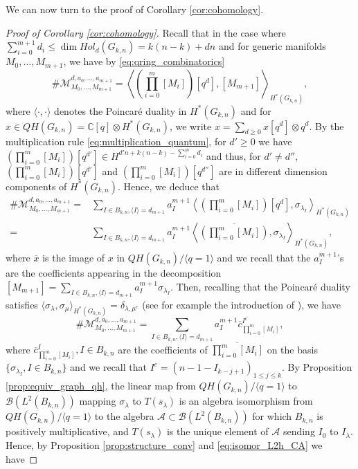 \documentclass[10pt,11pt]{amsart}%
\begin{document}
We can now turn to the proof of Corollary \ref{cor:cohomology}.
\begin{proof}[Proof of Corollary \ref{cor:cohomology}]
Recall that in the case where $\sum_{i=0}^{m+1} d_i\leq \dim Hol_d(G_{k,n})=k(n-k)+dn$ and for generic manifolds $M_0,\ldots, M_{m+1}$, we have by \eqref{eq:qring_combinatorics}
$$\#\mathcal{M}^{d,a_0,\ldots,a_{m+1}}_{M_0,\ldots,M_{m+1}}=\left\langle \left(\prod_{i=0}^{m} [M_i]\right)[q^d],[M_{m+1}]\right\rangle_{H^*(G_{k,n})},$$
where $\langle \cdot,\cdot\rangle$ denotes the Poincaré duality in $H^*(G_{k,n})$ and for $x\in QH(G_{k,n})=\mathbb{C}[q]\otimes H^*(G_{k,n})$, we write $x=\sum_{d\geq 0} x[q^d]\otimes q^d$. By the multiplication rule \eqref{eq:multiplication_quantum}, for $d'\geq 0$ we have $\left(\prod_{i=0}^{m} [M_i]\right)[q^{d'}]\in H^{d'n+k(n-k)-\sum_{i=0}^md_i}$ and thus, for $d'\not=d''$, $\left(\prod_{i=0}^{m} [M_i]\right)[q^{d'}]$ and $\left(\prod_{i=0}^{m} [M_i]\right)[q^{d''}]$ are in different dimension components of $H^*(G_{k,n})$. Hence, we deduce that 
\begin{align*}
\#\mathcal{M}^{d,a_0,\ldots,a_{m+1}}_{M_0,\ldots,M_{m+1}}=&\sum_{I\in B_{k,n},\langle I\rangle=d_{m+1}}a_{I}^{m+1}\left\langle \left(\prod_{i=0}^{m} [M_i]\right)[q^d],\sigma_{\lambda_I}\right\rangle_{H^*(G_{k,n})}\\
=&\sum_{I\in B_{k,n},\langle I\rangle=d_{m+1}}a_{I}^{m+1}\left\langle \overline{\left(\prod_{i=0}^{m} [M_i]\right)},\sigma_{\lambda_I}\right\rangle_{H^*(G_{k,n})},
\end{align*}
where $\overline{x}$ is the image of $x$ in $QH(G_{k,n})/\langle q=1\rangle$ and we recall that the $a_{I}^{m+1}$'s are the coefficients appearing in the decomposition $[M_{m+1}]=\sum_{I\in B_{k,n},\langle I\rangle=d_{m+1}}a_{I}^{m+1}\sigma_{\lambda_{I}}$. Then, recalling that the Poincaré duality satisfies $\langle \sigma_{\lambda},\sigma_{\mu}\rangle_{H^*(G_{k,n})}=\delta_{\lambda,\mu^c}$ (see for example the introduction of \cite{B}), we have 
$$\#\mathcal{M}^{d,a_0,\ldots,a_{m+1}}_{M_0,\ldots,M_{m+1}}=\sum_{I\in B_{k,n},\langle I\rangle=d_{m+1}}a_{I}^{m+1}\overline{c}_{\prod_{i=0}^{m} [M_i]}^{I^c},$$
where $\overline{c}_{\prod_{i=0}^{m} [M_i]}^{I}, I\in B_{k,n}$ are the coefficients of $\overline{\prod_{i=0}^{m} [M_i]}$ on the basis $\{\sigma_{\lambda_I}, I\in B_{k,n}\}$ and we recall that $I^c=(n-1-I_{k-j+1})_{1\leq j\leq k}$. By Proposition \ref{prop:equiv_graph_qh}, the linear map from $QH(G_{k,n})/\langle q=1\rangle$ to $\mathcal{B}(L^2(B_{k,n}))$ mapping  $\sigma_{\lambda}$ to $T(s_{\lambda})$ is an algebra isomorphism from $QH(G_{k,n})/\langle q=1\rangle$ to the algebra $\mathcal{A}\subset \mathcal{B}(L^2(B_{k,n}))$ for which $B_{k,n}$ is positively multiplicative, and $T(s_{\lambda})$ is the unique element of $\mathcal{A}$ sending $I_0$ to $I_{\lambda}$. Hence, by Proposition \ref{prop:structure_conv} and \eqref{eq:isomor_L2h_CA} we have 

\end{proof}
\end{document}
